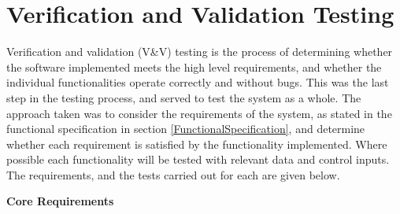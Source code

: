\section{Verification and Validation Testing} \label{ValidationTesting}
Verification and validation (V\&V) testing is the process of determining whether the software implemented meets the high level requirements, and whether the individual functionalities operate correctly and without bugs. This was the last step in the testing process, and served to test the system as a whole. The approach taken was to consider the requirements of the system, as stated in the functional specification in section \ref{FunctionalSpecification}, and determine whether each requirement is satisfied by the functionality implemented. Where possible each functionality will be tested with relevant data and control inputs. The requirements, and the tests carried out for each are given below.

\noindent\textbf{Core Requirements}

